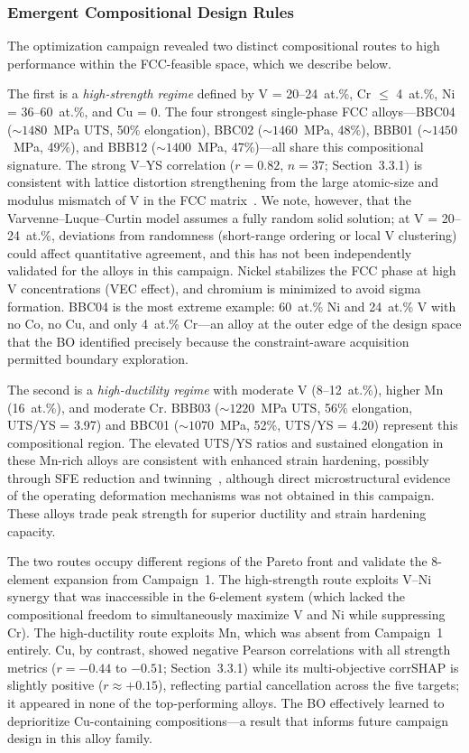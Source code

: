 \subsubsection{Emergent Compositional Design Rules}

The optimization campaign revealed two distinct compositional routes to high performance within the FCC-feasible space, which we describe below.

The first is a \emph{high-strength regime} defined by V = 20--24~at.\%, Cr $\leq$ 4~at.\%, Ni = 36--60~at.\%, and Cu = 0. The four strongest single-phase FCC alloys---BBC04 (${\sim}1480$~MPa UTS, 50\% elongation), BBC02 (${\sim}1460$~MPa, 48\%), BBB01 (${\sim}1450$~MPa, 49\%), and BBB12 (${\sim}1400$~MPa, 47\%)---all share this compositional signature. The strong V--YS correlation ($r = 0.82$, $n = 37$; Section~3.3.1) is consistent with lattice distortion strengthening from the large atomic-size and modulus mismatch of V in the FCC matrix~\cite{varvenne2016theory}. We note, however, that the Varvenne--Luque--Curtin model assumes a fully random solid solution; at V = 20--24~at.\%, deviations from randomness (short-range ordering or local V clustering) could affect quantitative agreement, and this has not been independently validated for the alloys in this campaign. Nickel stabilizes the FCC phase at high V concentrations (VEC effect), and chromium is minimized to avoid sigma formation. BBC04 is the most extreme example: 60~at.\% Ni and 24~at.\% V with no Co, no Cu, and only 4~at.\% Cr---an alloy at the outer edge of the design space that the BO identified precisely because the constraint-aware acquisition permitted boundary exploration.

The second is a \emph{high-ductility regime} with moderate V (8--12~at.\%), higher Mn (16~at.\%), and moderate Cr. BBB03 (${\sim}1220$~MPa UTS, 56\% elongation, UTS/YS = 3.97) and BBC01 (${\sim}1070$~MPa, 52\%, UTS/YS = 4.20) represent this compositional region. The elevated UTS/YS ratios and sustained elongation in these Mn-rich alloys are consistent with enhanced strain hardening, possibly through SFE reduction and twinning~\cite{li2016metastable, otto2013influences}, although direct microstructural evidence of the operating deformation mechanisms was not obtained in this campaign. These alloys trade peak strength for superior ductility and strain hardening capacity.

The two routes occupy different regions of the Pareto front and validate the 8-element expansion from Campaign~1. The high-strength route exploits V--Ni synergy that was inaccessible in the 6-element system (which lacked the compositional freedom to simultaneously maximize V and Ni while suppressing Cr). The high-ductility route exploits Mn, which was absent from Campaign~1 entirely. Cu, by contrast, showed negative Pearson correlations with all strength metrics ($r = -0.44$ to $-0.51$; Section~3.3.1) while its multi-objective corrSHAP is slightly positive ($r \approx +0.15$), reflecting partial cancellation across the five targets; it appeared in none of the top-performing alloys. The BO effectively learned to deprioritize Cu-containing compositions---a result that informs future campaign design in this alloy family.

